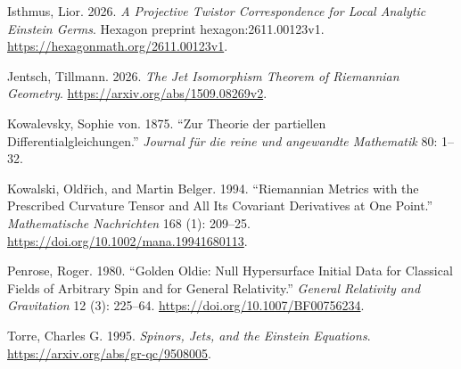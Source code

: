 \documentclass[
  english,
  11pt,
  reqno]{amsart}
\newlength{\cslhangindent}
\newenvironment{CSLReferences}[2] %
 {\begin{list}{}{%
  \setlength{\itemindent}{0pt}
  \setlength{\leftmargin}{0pt}
  \setlength{\parsep}{0pt}
  \ifodd #1
   \setlength{\leftmargin}{\cslhangindent}
   \setlength{\itemindent}{-1\cslhangindent}
  \fi
  \setlength{\itemsep}{#2\baselineskip}}}
 {\end{list}}
\begin{document}
\begin{CSLReferences}{1}{1}
Isthmus, Lior. 2026. \emph{A Projective Twistor Correspondence for Local
Analytic {Einstein} Germs}. Hexagon preprint hexagon:2611.00123v1.
\url{https://hexagonmath.org/2611.00123v1}.

Jentsch, Tillmann. 2026. \emph{The Jet Isomorphism Theorem of
{Riemannian} Geometry}. \url{https://arxiv.org/abs/1509.08269v2}.

Kowalevsky, Sophie von. 1875. {``{Zur Theorie der partiellen
Differentialgleichungen}.''} \emph{{Journal für die reine und angewandte
Mathematik}} 80: 1--32.

Kowalski, Oldřich, and Martin Belger. 1994. {``{Riemannian} Metrics with
the Prescribed Curvature Tensor and All Its Covariant Derivatives at One
Point.''} \emph{Mathematische Nachrichten} 168 (1): 209--25.
\url{https://doi.org/10.1002/mana.19941680113}.

Penrose, Roger. 1980. {``Golden Oldie: Null Hypersurface Initial Data
for Classical Fields of Arbitrary Spin and for General Relativity.''}
\emph{General Relativity and Gravitation} 12 (3): 225--64.
\url{https://doi.org/10.1007/BF00756234}.

Torre, Charles G. 1995. \emph{Spinors, Jets, and the {Einstein}
Equations}. \url{https://arxiv.org/abs/gr-qc/9508005}.

\end{CSLReferences}
\end{document}

